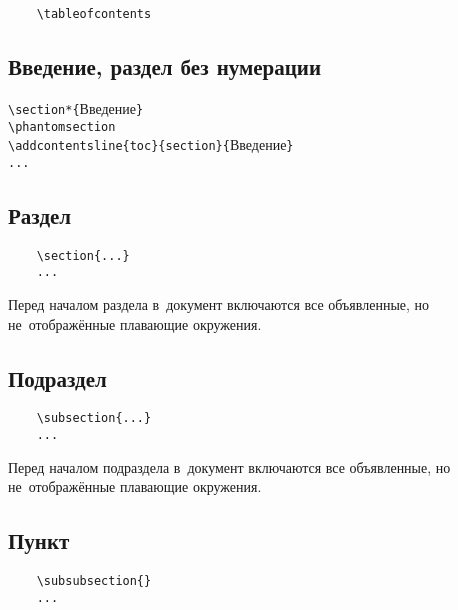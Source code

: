 \documentclass{mirea-prog-lang}
\begin{document}
\begin{verbatim}
	\tableofcontents
\end{verbatim}

\subsection{Введение, раздел без нумерации}

\noindent\verb"\section*{"Введение\verb"}"\\
\verb"\phantomsection"\\
\verb"\addcontentsline{toc}{section}{"Введение\verb"}"\\
\verb"..."

\subsection{Раздел}

\begin{verbatim}
	\section{...}
	...
\end{verbatim}

Перед началом раздела в~документ включаются все объявленные, но не~отображённые плавающие окружения.

\subsection{Подраздел}

\begin{verbatim}
	\subsection{...}
	...
\end{verbatim}

Перед началом подраздела в~документ включаются все объявленные, но не~отображённые плавающие окружения.

\subsection{Пункт}

\begin{verbatim}
	\subsubsection{}
	...
\end{verbatim}
\end{document}
